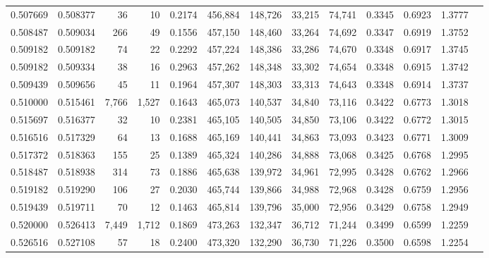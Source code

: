 \begin{tabular}{rrrrrrrrrrrrr}
0.507669 & 0.508377 &     36 &    10 &                                     0.2174 & 456,884 & 148,726 &  33,215 &  74,741 & 0.3345 & 0.6923 & 1.3777 \\
0.508487 & 0.509034 &    266 &    49 &                                     0.1556 & 457,150 & 148,460 &  33,264 &  74,692 & 0.3347 & 0.6919 & 1.3752 \\
0.509182 & 0.509182 &     74 &    22 &                                     0.2292 & 457,224 & 148,386 &  33,286 &  74,670 & 0.3348 & 0.6917 & 1.3745 \\
0.509182 & 0.509334 &     38 &    16 &                                     0.2963 & 457,262 & 148,348 &  33,302 &  74,654 & 0.3348 & 0.6915 & 1.3742 \\
0.509439 & 0.509656 &     45 &    11 &                                     0.1964 & 457,307 & 148,303 &  33,313 &  74,643 & 0.3348 & 0.6914 & 1.3737 \\
0.510000 & 0.515461 &  7,766 & 1,527 &                                     0.1643 & 465,073 & 140,537 &  34,840 &  73,116 & 0.3422 & 0.6773 & 1.3018 \\
0.515697 & 0.516377 &     32 &    10 &                                     0.2381 & 465,105 & 140,505 &  34,850 &  73,106 & 0.3422 & 0.6772 & 1.3015 \\
0.516516 & 0.517329 &     64 &    13 &                                     0.1688 & 465,169 & 140,441 &  34,863 &  73,093 & 0.3423 & 0.6771 & 1.3009 \\
0.517372 & 0.518363 &    155 &    25 &                                     0.1389 & 465,324 & 140,286 &  34,888 &  73,068 & 0.3425 & 0.6768 & 1.2995 \\
0.518487 & 0.518938 &    314 &    73 &                                     0.1886 & 465,638 & 139,972 &  34,961 &  72,995 & 0.3428 & 0.6762 & 1.2966 \\
0.519182 & 0.519290 &    106 &    27 &                                     0.2030 & 465,744 & 139,866 &  34,988 &  72,968 & 0.3428 & 0.6759 & 1.2956 \\
0.519439 & 0.519711 &     70 &    12 &                                     0.1463 & 465,814 & 139,796 &  35,000 &  72,956 & 0.3429 & 0.6758 & 1.2949 \\
0.520000 & 0.526413 &  7,449 & 1,712 &                                     0.1869 & 473,263 & 132,347 &  36,712 &  71,244 & 0.3499 & 0.6599 & 1.2259 \\
0.526516 & 0.527108 &     57 &    18 &                                     0.2400 & 473,320 & 132,290 &  36,730 &  71,226 & 0.3500 & 0.6598 & 1.2254 \\

\end{tabular}
